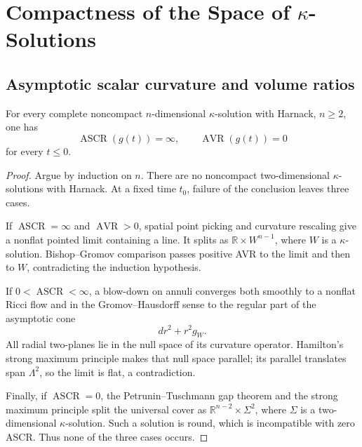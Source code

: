 \chapter[20]{\texorpdfstring{Compactness of the Space of $\kappa$-Solutions}{Compactness of the Space of Kappa-Solutions}}
\label{ch:chow-iii-compactness-kappa-solutions}

\section{Asymptotic scalar curvature and volume ratios}

\begin{theorem}[$\kappa$-solutions with Harnack have ASCR $=\infty$ and AVR $=0$]
\label{thm:chow-iii-kappa-harnack-ascr-avr}


For every complete noncompact $n$-dimensional $\kappa$-solution with Harnack,
$n\ge2$, one has
\[
 \operatorname{ASCR}(g(t))=\infty,
 \qquad \operatorname{AVR}(g(t))=0
\]
for every $t\le0$.
\end{theorem}
\begin{proof}
\sketch Argue by induction on $n$.  There are no noncompact two-dimensional
$\kappa$-solutions with Harnack.  At a fixed time $t_0$, failure of the
conclusion leaves three cases.

If $\operatorname{ASCR}=\infty$ and $\operatorname{AVR}>0$, spatial point
picking and curvature rescaling give a nonflat pointed limit containing a
line.  It splits as $\mathbb R\times W^{n-1}$, where $W$ is a
$\kappa$-solution.  Bishop--Gromov comparison passes positive AVR to the
limit and then to $W$, contradicting the induction hypothesis.

If $0<\operatorname{ASCR}<\infty$, a blow-down on annuli converges both
smoothly to a nonflat Ricci flow and in the Gromov--Hausdorff sense to the
regular part of the asymptotic cone
\[
 dr^2+r^2g_W.
\]
All radial two-planes lie in the null space of its curvature operator.
Hamilton's strong maximum principle makes that null space parallel; its
parallel translates span $\Lambda^2$, so the limit is flat, a contradiction.

Finally, if $\operatorname{ASCR}=0$, the Petrunin--Tuschmann gap theorem and
the strong maximum principle split the universal cover as
$\mathbb R^{n-2}\times\Sigma^2$, where $\Sigma$ is a two-dimensional
$\kappa$-solution.  Such a solution is round, which is incompatible with
zero ASCR.  Thus none of the three cases occurs.
\end{proof}


